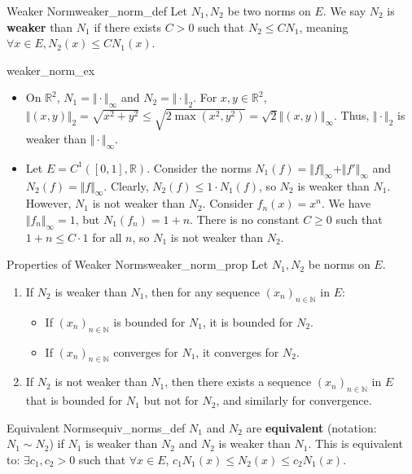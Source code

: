 \documentclass[11pt, a4paper]{article}
\newcommand{\R}{\mathbb{R}}
\newcommand{\N}{\mathbb{N}}
\begin{document}
\begin{definition}{Weaker Norm}{weaker_norm_def}
Let $N_1, N_2$ be two norms on $E$. We say $N_2$ is \textbf{weaker} than $N_1$ if there exists $C > 0$ such that $N_2 \le C N_1$, meaning $\forall x \in E, N_2(x) \le C N_1(x)$.
\end{definition}

\begin{example}{}{weaker_norm_ex}
\begin{itemize}
    \item On $\R^2$, $N_1 = \Vert \cdot \Vert_\infty$ and $N_2 = \Vert \cdot \Vert_2$. For $x, y \in \R^2$, $\Vert (x,y) \Vert_2 = \sqrt{x^2 + y^2} \le \sqrt{2 \max(x^2, y^2)} = \sqrt{2} \Vert (x,y) \Vert_\infty$. Thus, $\Vert \cdot \Vert_2$ is weaker than $\Vert \cdot \Vert_\infty$.
    \item Let $E = C^1([0,1], \R)$. Consider the norms $N_1(f) = \Vert f \Vert_\infty + \Vert f' \Vert_\infty$ and $N_2(f) = \Vert f \Vert_\infty$.
    Clearly, $N_2(f) \le 1 \cdot N_1(f)$, so $N_2$ is weaker than $N_1$.
    However, $N_1$ is not weaker than $N_2$. Consider $f_n(x) = x^n$. We have $\Vert f_n \Vert_\infty = 1$, but $N_1(f_n) = 1 + n$. There is no constant $C \ge 0$ such that $1+n \le C \cdot 1$ for all $n$, so $N_1$ is not weaker than $N_2$.
\end{itemize}
\end{example}

\begin{proposition}{Properties of Weaker Norms}{weaker_norm_prop}
Let $N_1, N_2$ be norms on $E$.
\begin{enumerate}
    \item If $N_2$ is weaker than $N_1$, then for any sequence $(x_n)_{n \in \N}$ in $E$:
    \begin{itemize}
        \item If $(x_n)_{n \in \N}$ is bounded for $N_1$, it is bounded for $N_2$.
        \item If $(x_n)_{n \in \N}$ converges for $N_1$, it converges for $N_2$.
    \end{itemize}
    \item If $N_2$ is not weaker than $N_1$, then there exists a sequence $(x_n)_{n \in \N}$ in $E$ that is bounded for $N_1$ but not for $N_2$, and similarly for convergence.
\end{enumerate}
\end{proposition}

\begin{definition}{Equivalent Norms}{equiv_norms_def}
$N_1$ and $N_2$ are \textbf{equivalent} (notation: $N_1 \sim N_2$) if $N_1$ is weaker than $N_2$ and $N_2$ is weaker than $N_1$.
This is equivalent to: $\exists c_1, c_2 > 0$ such that $\forall x \in E$, $c_1 N_1(x) \le N_2(x) \le c_2 N_1(x)$.
\end{definition}
\end{document}
